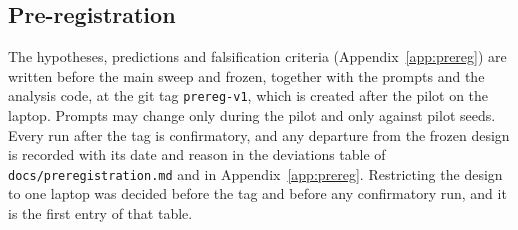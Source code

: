 \subsection{Pre-registration}
\label{sec:setup:prereg}

The hypotheses, predictions and falsification criteria (Appendix~\ref{app:prereg}) are written before the main sweep and frozen, together with the prompts and the analysis code, at the git tag \texttt{prereg-v1}, which is created after the pilot on the laptop. Prompts may change only during the pilot and only against pilot seeds. Every run after the tag is confirmatory, and any departure from the frozen design is recorded with its date and reason in the deviations table of \texttt{docs/preregistration.md} and in Appendix~\ref{app:prereg}. Restricting the design to one laptop was decided before the tag and before any confirmatory run, and it is the first entry of that table. 
